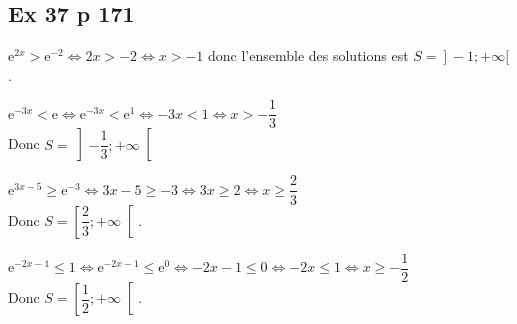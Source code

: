 \documentclass[12pt,a4paper]{book}
\begin{document}
\subsection*{Ex 37 p 171}
\begin{enumMet}
    \item $\mathrm{e}^{2 x}>\mathrm{e}^{-2} \Leftrightarrow 2 x>-2 \Leftrightarrow x>-1$ donc l'ensemble des solutions est $\left.S=\right]-1 ;+\infty[$.
    \item $\mathrm{e}^{-3 x}<\mathrm{e} \Leftrightarrow \mathrm{e}^{-3 x}<\mathrm{e}^{1} \Leftrightarrow-3 x<1 \Leftrightarrow x>-\dfrac{1}{3}$\\
    Donc $S=\left]-\dfrac{1}{3} ;+\infty\right[$
    \item $\mathrm{e}^{3 x-5} \geqslant \mathrm{e}^{-3} \Leftrightarrow 3 x-5 \geqslant-3 \Leftrightarrow 3 x \geqslant 2 \Leftrightarrow x \geqslant \dfrac{2}{3}$\\
    Donc $S=\left[\dfrac{2}{3} ;+\infty\right[.$
    \item $\mathrm{e}^{-2 x-1} \leqslant 1 \Leftrightarrow \mathrm{e}^{-2 x-1} \leqslant \mathrm{e}^{0} \Leftrightarrow-2 x-1 \leqslant 0 \Leftrightarrow-2 x \leqslant 1 \Leftrightarrow x \geqslant-\dfrac{1}{2}$\\
    Donc $S=\left[\dfrac{1}{2} ;+\infty\right[$.
\end{enumMet}
\end{document}
